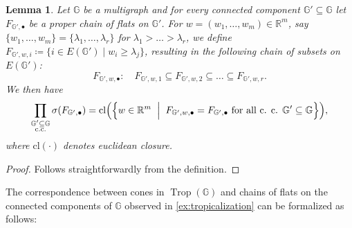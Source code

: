 \documentclass[11pt,reqno,a4paper]{amsart}
\theoremstyle{theoremstyle}
\newtheorem{lemma}[theorem]{Lemma}
\theoremstyle{examplestyle}
\theoremstyle{algorithmstyle}
\newcommand{\GG}{\mathbb{G}}
\newcommand{\RR}{\mathbb{R}}
\newcommand{\suchthat}{\;\ifnum\currentgrouptype=16 \middle\fi|\;}
\newcommand{\bigmid}{\left.\vphantom{\Big\{} \suchthat \vphantom{\Big\}}\right.}
\DeclareMathOperator{\Trop}{Trop}
\begin{document}
\begin{lemma}
  \label{lem:bergmanConeToChainOfFlats}
  Let $\GG$ be a multigraph and for every connected component $\GG'\subseteq\GG$ let $F_{\GG',\bullet}$ be a proper chain of flats on $\GG'$.
  For $w=(w_1,\dots,w_m)\in\RR^m$, say $\{w_1,\dots,w_m\}=\{\lambda_1,\dots,\lambda_r\}$ for $\lambda_1>\dots>\lambda_r$, we define $F_{\GG',w,i}\coloneqq \{i\in E(\GG')\mid w_i\geq \lambda_j\}$, resulting in the following chain of subsets on $E(\GG')$:
  \begin{equation*}
    F_{\GG',w,\bullet}\colon\quad F_{\GG',w,1}\subseteq F_{\GG',w,2}\subseteq\dots\subseteq F_{\GG',w,r}.
  \end{equation*}
  We then have
  \begin{equation*}
    \prod_{\substack{\GG'\subseteq\GG\\\text{c.c.}}} \sigma(F_{\GG',\bullet}) = \mathrm{cl}\Big(\Big\{w\in\RR^m\bigmid F_{\GG',w,\bullet}=F_{\GG',\bullet} \text{ for all c. c. } \GG'\subseteq\GG\Big\}\Big),
  \end{equation*}
  where $\mathrm{cl}(\cdot)$ denotes euclidean closure.
\end{lemma}
\begin{proof}
  Follows straightforwardly from the definition.
\end{proof}


The correspondence between cones in $\Trop(\GG)$ and chains of flats on the connected components of $\GG$ observed in \cref{ex:tropicalization} can be formalized as follows:
\end{document}
